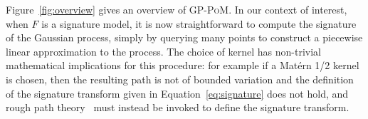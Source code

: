\documentclass{article}
\newcommand{\reals}{\mathbb{R}}
\newcommand{\dataspace}{\mathcal{X}}
\newcommand{\lspace}{\mathcal{Y}}
\newcommand{\seriesspace}{\mathcal{S}}
\begin{document}
%
Figure~\ref{fig:overview} gives an overview of \textsc{GP-PoM}. 
%
In our context of interest, when $F$ is a signature model, it is now
straightforward to compute the signature of the Gaussian process, simply
by querying many points to construct a piecewise linear approximation to
the process.  The choice of kernel has non-trivial mathematical
implications for this procedure: for example if a Mat{\'e}rn 1/2 kernel
is chosen, then the resulting path is not of bounded variation and the
definition of the signature transform given in Equation~\eqref{eq:signature}
does not hold, and rough path theory~\citep{lyons1998differential} must instead be invoked to define the
signature transform.



\end{document}
